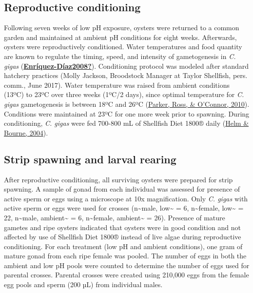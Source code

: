 \documentclass [11pt, proquest] {uwthesis}[2015/03/03]
\begin{document}
\hypertarget{reproductive-conditioning}{%
\subsection{Reproductive conditioning}\label{reproductive-conditioning}}

Following seven weeks of low pH exposure, oysters were returned to a common garden and maintained at ambient pH conditions for eight weeks. Afterwards, oysters were reproductively conditioned. Water temperatures and food quantity are known to regulate the timing, speed, and intensity of gametogenesis in \emph{C. gigas} (\protect\hyperlink{ref-Enruxedquez-Duxedaz2008}{\textbf{Enríquez-Díaz2008?}}). Conditioning protocol was modeled after standard hatchery practices (Molly Jackson, Broodstock Manager at Taylor Shellfish, pers. comm., June 2017). Water temperature was raised from ambient conditions (13ºC) to 23ºC over three weeks (1ºC/2 days), since optimal temperature for \emph{C. gigas} gametogenesis is between 18ºC and 26ºC (\protect\hyperlink{ref-Parker2010}{Parker, Ross, \& O'Connor, 2010}). Conditions were maintained at 23ºC for one more week prior to spawning. During conditioning, \emph{C. gigas} were fed 700-800 mL of Shellfish Diet 1800® daily (\protect\hyperlink{ref-Helm2004}{Helm \& Bourne, 2004}).

\hypertarget{strip-spawning-and-larval-rearing}{%
\subsection{Strip spawning and larval rearing}\label{strip-spawning-and-larval-rearing}}

After reproductive conditioning, all surviving oysters were prepared for strip spawning. A sample of gonad from each individual was assessed for presence of active sperm or eggs using a microscope at 10x magnification. Only \emph{C. gigas} with active sperm or eggs were used for crosses (n\textasciitilde male, low\textasciitilde{} = 6, n\textasciitilde female, low\textasciitilde{} = 22, n\textasciitilde male, ambient\textasciitilde{} = 6, n\textasciitilde female, ambient\textasciitilde{} = 26). Presence of mature gametes and ripe oysters indicated that oysters were in good condition and not affected by use of Shellfish Diet 1800® instead of live algae during reproductive conditioning. For each treatment (low pH and ambient conditions), one gram of mature gonad from each ripe female was pooled. The number of eggs in both the ambient and low pH pools were counted to determine the number of eggs used for parental crosses. Parental crosses were created using 210,000 eggs from the female egg pools and sperm (200 µL) from individual males.
\end{document}
